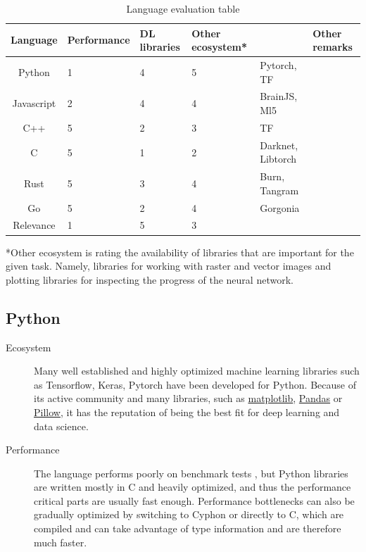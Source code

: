 \documentclass[12pt, a4paper, titlepage]{report}
\begin{document}
\begin{table}
   \begin{tabular} {|c||p{2.2cm}|p{2.2cm}|p{2.5cm}|p{2.2cm}|p{2.2cm}|}
      \hline
      Language    & Performance & DL libraries & Other ecosystem* & & Other remarks \\
      \hline\hline
      Python      & 1 & 4 & 5 & Pytorch, TF & \\ \hline
      Javascript  & 2 & 4 & 4 & BrainJS, Ml5 & \\ \hline
      C++         & 5 & 2 & 3 & TF &\\ \hline
      C           & 5 & 1 & 2 & Darknet, Libtorch &\\ \hline
      Rust        & 5 & 3 & 4 & Burn, Tangram &\\ \hline
      Go          & 5 & 2 & 4 & Gorgonia &\\
      \hline
      Relevance   & 1 & 5 & 3 &   &   \\
      \hline
   \end{tabular}
   \caption{Language evaluation table}
   \label{table:language_evaluation}
\end{table}

*Other ecosystem is rating the availability of libraries that are important for the given task. Namely, libraries for working with raster and vector images and plotting libraries for inspecting the progress of the neural network.

{
   \center
   \subsection*{Python}
}
\begin{description}
   \item[Ecosystem] Many well established and highly optimized machine learning libraries such as Tensorflow, Keras, Pytorch have been developed for Python. Because of its active community and many libraries, such as \href{}{matplotlib}, \href{}{Pandas} or \href{}{Pillow}, it has the reputation of being the best fit for deep learning and data science.
   \item[Performance] The language performs poorly on benchmark tests \cite{goodmanwen_programming-language-benchmarks-visualization_2023}, but Python libraries are written mostly in C and heavily optimized, and thus the performance critical parts are usually fast enough. Performance bottlenecks can also be gradually optimized by switching to Cyphon or directly to C, which are compiled and can take advantage of type information and are therefore much faster.
\end{description}
\end{document}

